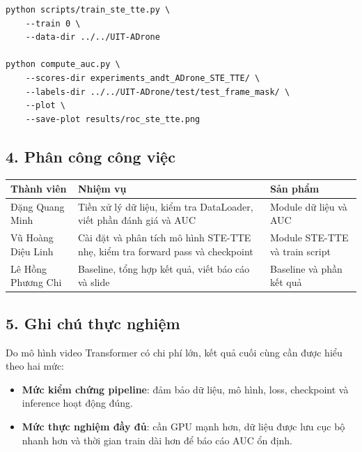 \begin{verbatim}
python scripts/train_ste_tte.py \
    --train 0 \
    --data-dir ../../UIT-ADrone

python compute_auc.py \
    --scores-dir experiments_andt_ADrone_STE_TTE/ \
    --labels-dir ../../UIT-ADrone/test/test_frame_mask/ \
    --plot \
    --save-plot results/roc_ste_tte.png
\end{verbatim}

\subsection*{4. Phân công công việc}

\begin{center}
\begin{tabular}{|p{3.2cm}|p{6.2cm}|p{3.2cm}|}
\hline
\textbf{Thành viên} & \textbf{Nhiệm vụ} & \textbf{Sản phẩm} \\
\hline
Đặng Quang Minh & Tiền xử lý dữ liệu, kiểm tra DataLoader, viết phần đánh giá và AUC & Module dữ liệu và AUC \\
\hline
Vũ Hoàng Diệu Linh & Cài đặt và phân tích mô hình STE-TTE nhẹ, kiểm tra forward pass và checkpoint & Module STE-TTE và train script \\
\hline
Lê Hồng Phương Chi & Baseline, tổng hợp kết quả, viết báo cáo và slide & Baseline và phần kết quả \\
\hline
\end{tabular}
\end{center}

\subsection*{5. Ghi chú thực nghiệm}

Do mô hình video Transformer có chi phí lớn, kết quả cuối cùng cần được hiểu theo hai mức:

\begin{itemize}
    \item \textbf{Mức kiểm chứng pipeline}: đảm bảo dữ liệu, mô hình, loss, checkpoint và inference hoạt động đúng.
    \item \textbf{Mức thực nghiệm đầy đủ}: cần GPU mạnh hơn, dữ liệu được lưu cục bộ nhanh hơn và thời gian train dài hơn để báo cáo AUC ổn định.
\end{itemize}
